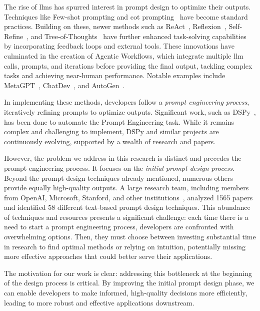 \documentclass[12pt,twoside,english]{article}
\begin{document}
The rise of \glspl{llm} has spurred interest in prompt design to optimize their outputs. Techniques like Few-shot prompting and \gls{cot} prompting~\cite{wei2023chainofthoughtpromptingelicitsreasoning} have become standard practices. Building on these, newer methods such as ReAct~\cite{yao2023reactsynergizingreasoningacting}, Reflexion~\cite{shinn2023reflexionlanguageagentsverbal}, Self-Refine~\cite{madaan2023selfrefineiterativerefinementselffeedback}, and Tree-of-Thoughts~\cite{yao2023treethoughtsdeliberateproblem} have further enhanced task-solving capabilities by incorporating feedback loops and external tools. These innovations have culminated in the creation of Agentic Workflows, which integrate multiple \gls{llm} calls, prompts, and iterations before providing the final output, tackling complex tasks and achieving near-human performance. Notable examples include MetaGPT~\cite{hong2024metagptmetaprogrammingmultiagent}, ChatDev~\cite{qian2024chatdevcommunicativeagentssoftware}, and AutoGen~\cite{wu2023autogenenablingnextgenllm}.

In implementing these methods, developers follow a \textit{prompt engineering process}, iteratively refining prompts to optimize outputs. Significant work, such as DSPy~\cite{khattab2023dspycompilingdeclarativelanguage}, has been done to automate the Prompt Engineering task. While it remains complex and challenging to implement, DSPy and similar projects are continuously evolving, supported by a wealth of research and papers.

However, the problem we address in this research is distinct and precedes the prompt engineering process. It focuses on the \textit{initial prompt design process}. Beyond the prompt design techniques already mentioned, numerous others provide equally high-quality outputs. A large research team, including members from OpenAI, Microsoft, Stanford, and other institutions~\cite{schulhoff2024promptreportsystematicsurvey}, analyzed 1565 papers and identified 58 different text-based prompt design techniques. This abundance of techniques and resources presents a significant challenge: each time there is a need to start a prompt engineering process, developers are confronted with overwhelming options. Then, they must choose between investing substantial time in research to find optimal methods or relying on intuition, potentially missing more effective approaches that could better serve their applications.

The motivation for our work is clear: addressing this bottleneck at the beginning of the design process is critical. By improving the initial prompt design phase, we can enable developers to make informed, high-quality decisions more efficiently, leading to more robust and effective applications downstream.
\end{document}
